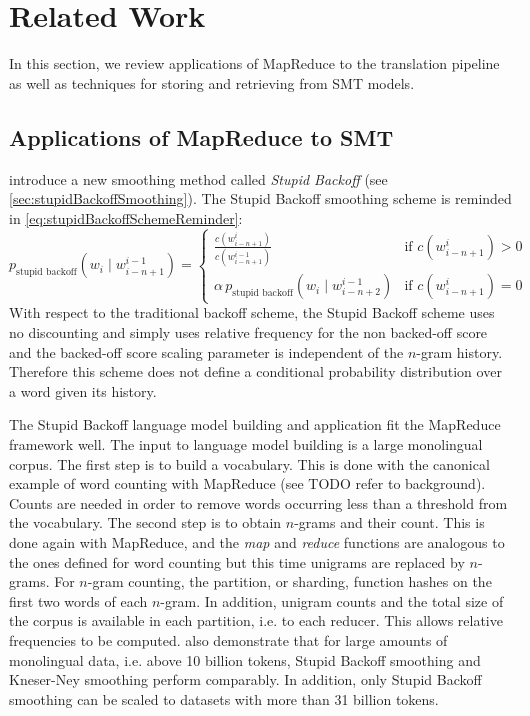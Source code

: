 \section{Related Work}
\label{sec:relatedwork}

In this section, we review applications of MapReduce to
the translation pipeline as well as techniques for storing
and retrieving from SMT models.

\subsection{Applications of MapReduce to SMT}
\label{sec:applicationsMapReduceSMT}

\citet{brants-popat-xu-och-dean:2007:EMNLP-CoNLL}
introduce a new smoothing method called
\emph{Stupid Backoff} (see \autoref{sec:stupidBackoffSmoothing}).
The Stupid Backoff smoothing scheme is reminded in \autoref{eq:stupidBackoffSchemeReminder}:
%
\begin{equation}
  p_{\text{stupid backoff}}(w_i \mid w_{i - n + 1}^{i - 1}) =
  \begin{cases}
    \frac{c(w_{i - n + 1}^i)}{c(w_{i - n + 1}^{i - 1})} & \text{if } c(w_{i - n + 1}^i) > 0 \\
    \alpha \, p_{\text{stupid backoff}}(w_i \mid w_{i - n + 2}^{i - 1}) & \text{if } c(w_{i - n + 1}^i) = 0
  \end{cases}
  \label{eq:stupidBackoffSchemeReminder}
\end{equation}
%
With respect to the traditional backoff scheme, the Stupid Backoff
scheme uses no discounting and simply uses relative frequency
for the non backed-off score and the backed-off score
scaling parameter is independent of
the $n$-gram history.
Therefore this scheme does not define a conditional probability
distribution %
over a word given its history.

The Stupid Backoff language model building and application fit the
MapReduce framework well. The input to language model building
is a large monolingual corpus. The first step is to build
a vocabulary. This is done with the canonical example of word
counting with MapReduce (see TODO refer to background). Counts
are needed in order to remove words occurring less than a threshold
from the vocabulary. The second step is to obtain $n$-grams and their
count. This is done again with MapReduce, and the \emph{map} and \emph{reduce}
functions are analogous to the ones defined for word counting but this time
unigrams are replaced by $n$-grams.
For $n$-gram counting, the partition, or sharding, function hashes
on the first two words of each $n$-gram. In addition, unigram counts
and the total size of the corpus is available in each partition, i.e.
to each reducer. This allows relative frequencies to be computed.
\citet{brants-popat-xu-och-dean:2007:EMNLP-CoNLL} also
demonstrate
that for large amounts of monolingual data, i.e. above 10 billion
tokens, Stupid Backoff smoothing and Kneser-Ney smoothing perform comparably.
In addition, only
Stupid Backoff smoothing can be scaled to datasets
with more than 31 billion tokens.

